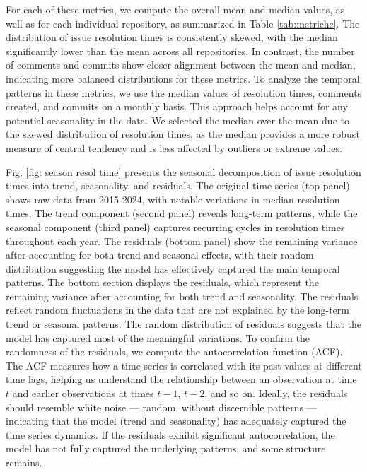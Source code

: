 For each of these metrics, we compute the overall mean and median values, as well as for each individual repository, as summarized in Table \ref{tab:metriche}. The distribution of issue resolution times is consistently skewed, with the median significantly lower than the mean across all repositories. In contrast, the number of comments and commits show closer alignment between the mean and median, indicating more balanced distributions for these metrics.
To analyze the temporal patterns in these metrics, we use the median values of resolution times, comments created, and commits on a monthly basis. This approach helps account for any potential seasonality in the data. We selected the median over the mean due to the skewed distribution of resolution times, as the median provides a more robust measure of central tendency and is less affected by outliers or extreme values. 

Fig. \ref{fig: season resol time} presents the seasonal decomposition of issue resolution times into trend, seasonality, and residuals. The original time series (top panel) shows raw data from 2015-2024, with notable variations in median resolution times. The trend component (second panel) reveals long-term patterns, while the seasonal component (third panel) captures recurring cycles in resolution times throughout each year. The residuals (bottom panel) show the remaining variance after accounting for both trend and seasonal effects, with their random distribution suggesting the model has effectively captured the main temporal patterns.
The bottom section displays the residuals, which represent the remaining variance after accounting for both trend and seasonality. The residuals reflect random fluctuations in the data that are not explained by the long-term trend or seasonal patterns. The random distribution of residuals suggests that the model has captured most of the meaningful variations.
To confirm the randomness of the residuals, we compute the autocorrelation function (ACF). The ACF measures how a time series is correlated with its past values at different time lags, helping us understand the relationship between an observation at time $t$ and earlier observations at times $t - 1$, $t - 2$, and so on. Ideally, the residuals should resemble white noise — random, without discernible patterns — indicating that the model (trend and seasonality) has adequately captured the time series dynamics. If the residuals exhibit significant autocorrelation, the model has not fully captured the underlying patterns, and some structure remains.

